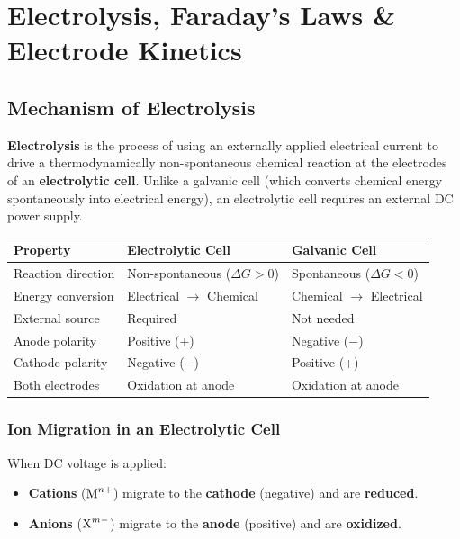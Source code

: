 \chapter{Electrolysis, Faraday's Laws \& Electrode Kinetics}
\label{chap:electrolysis_faraday}

\section{Mechanism of Electrolysis}

\textbf{Electrolysis} is the process of using an externally applied electrical current to drive a thermodynamically non-spontaneous chemical reaction at the electrodes of an \textbf{electrolytic cell}. Unlike a galvanic cell (which converts chemical energy spontaneously into electrical energy), an electrolytic cell requires an external DC power supply.

\begin{conceptbox}
\begin{center}
\begin{tabular}{lll}
\toprule
\textbf{Property} & \textbf{Electrolytic Cell} & \textbf{Galvanic Cell}\\
\midrule
Reaction direction & Non-spontaneous ($\Delta G>0$) & Spontaneous ($\Delta G<0$)\\
Energy conversion & Electrical $\to$ Chemical & Chemical $\to$ Electrical\\
External source & Required & Not needed\\
Anode polarity & Positive (+) & Negative ($-$)\\
Cathode polarity & Negative ($-$) & Positive (+)\\
Both electrodes & Oxidation at anode & Oxidation at anode\\
\bottomrule
\end{tabular}
\end{center}
\end{conceptbox}

\subsection{Ion Migration in an Electrolytic Cell}
When DC voltage is applied:
\begin{itemize}
    \item \textbf{Cations} ($\ce{M^{n+}}$) migrate to the \textbf{cathode} (negative) and are \textbf{reduced}.
    \item \textbf{Anions} ($\ce{X^{m-}}$) migrate to the \textbf{anode} (positive) and are \textbf{oxidized}.
\end{itemize}

